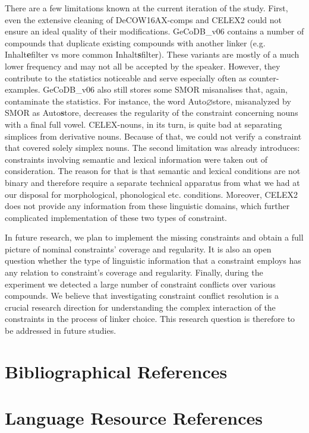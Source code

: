 \documentclass[10pt, a4paper]{article}
\newcommand{\zeroLinker}{\ensuremath{\boldsymbol{\varnothing}}}
\begin{document}
There are a few limitations known at the current iteration of the study. First, even the extensive cleaning of DeCOW16AX-comps and CELEX2 could not ensure an ideal quality of their modifications. GeCoDB\_v06 contains a number of compounds that duplicate existing compounds with another linker (e.g. Inhalt\textbf{e}filter vs more common Inhalt\textbf{s}filter). These variants are mostly of a much lower frequency and may not all be accepted by the speaker. However, they contribute to the statistics noticeable and serve especially often as counter-examples. GeCoDB\_v06 also still stores some SMOR misanalises that, again, contaminate the statistics. For instance, the word Auto{\zeroLinker}store, misanalyzed by SMOR as Auto\textbf{s}tore, decreases the regularity of the constraint concerning nouns with a final full vowel. CELEX-nouns, in its turn, is quite bad at separating simplices from derivative nouns. Because of that, we could not verify a constraint that covered solely simplex nouns. The second limitation was already introduces: constraints involving semantic and lexical information were taken out of consideration. The reason for that is that semantic and lexical conditions are not binary and therefore require a separate technical apparatus from what we had at our disposal for morphological, phonological etc. conditions. Moreover, CELEX2 does not provide any information from these linguistic domains, which further complicated implementation of these two types of constraint.

In future research, we plan to implement the missing constraints and obtain a full picture of nominal constraints' coverage and regularity. It is also an open question whether the type of linguistic information that a constraint employs has any relation to constraint's coverage and regularity. Finally, during the experiment we detected a large number of constraint conflicts over various compounds. We believe that investigating constraint conflict resolution is a crucial research direction for understanding the complex interaction of the constraints in the process of linker choice. This research question is therefore to be addressed in future studies.


\section{Bibliographical References}\label{sec:reference}




\section{Language Resource References}
\label{lr:ref}
\end{document}
